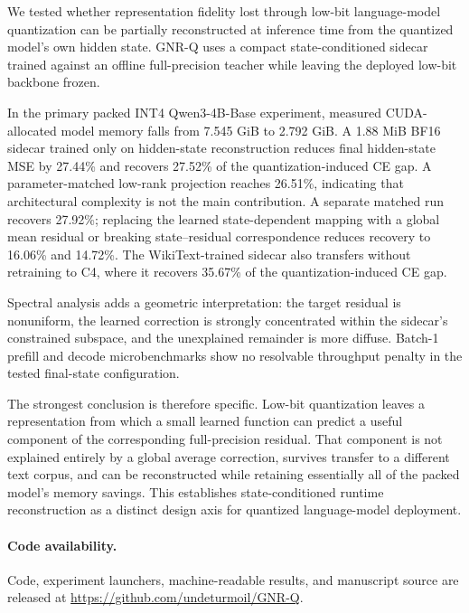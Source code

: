 \documentclass[11pt]{article}
\begin{document}
We tested whether representation fidelity lost through low-bit language-model quantization can be partially reconstructed at inference time from the quantized model's own hidden state. GNR-Q uses a compact state-conditioned sidecar trained against an offline full-precision teacher while leaving the deployed low-bit backbone frozen.

In the primary packed INT4 Qwen3-4B-Base experiment, measured CUDA-allocated model memory falls from 7.545 GiB to 2.792 GiB. A 1.88 MiB BF16 sidecar trained only on hidden-state reconstruction reduces final hidden-state MSE by 27.44\% and recovers 27.52\% of the quantization-induced CE gap. A parameter-matched low-rank projection reaches 26.51\%, indicating that architectural complexity is not the main contribution. A separate matched run recovers 27.92\%; replacing the learned state-dependent mapping with a global mean residual or breaking state--residual correspondence reduces recovery to 16.06\% and 14.72\%. The WikiText-trained sidecar also transfers without retraining to C4, where it recovers 35.67\% of the quantization-induced CE gap.

Spectral analysis adds a geometric interpretation: the target residual is nonuniform, the learned correction is strongly concentrated within the sidecar's constrained subspace, and the unexplained remainder is more diffuse. Batch-1 prefill and decode microbenchmarks show no resolvable throughput penalty in the tested final-state configuration.

The strongest conclusion is therefore specific. Low-bit quantization leaves a representation from which a small learned function can predict a useful component of the corresponding full-precision residual. That component is not explained entirely by a global average correction, survives transfer to a different text corpus, and can be reconstructed while retaining essentially all of the packed model's memory savings. This establishes state-conditioned runtime reconstruction as a distinct design axis for quantized language-model deployment.

\paragraph{Code availability.}
Code, experiment launchers, machine-readable results, and manuscript source are released at \url{https://github.com/undeturmoil/GNR-Q}.
\end{document}
